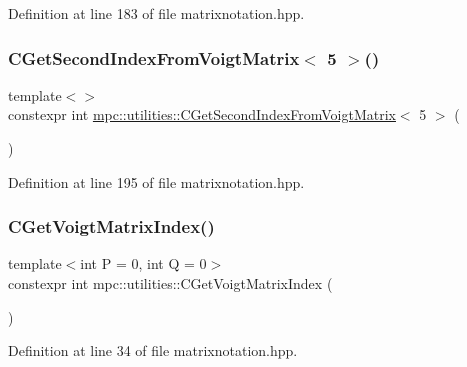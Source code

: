 Definition at line 183 of file matrixnotation.\+hpp.

\mbox{\label{namespacempc_1_1utilities_a070e4f2163645cfbe7e03651d594016e}} 
\subsubsection{\texorpdfstring{C\+Get\+Second\+Index\+From\+Voigt\+Matrix$<$ 5 $>$()}{CGetSecondIndexFromVoigtMatrix< 5 >()}}
{\footnotesize\ttfamily template$<$$>$ \\
constexpr int \mbox{\hyperlink{namespacempc_1_1utilities_a094a324d81b996e8397336286264dfcd}{mpc\+::utilities\+::\+C\+Get\+Second\+Index\+From\+Voigt\+Matrix}}$<$ 5 $>$ (\begin{DoxyParamCaption}{ }\end{DoxyParamCaption})\hspace{0.3cm}{\ttfamily [inline]}}



Definition at line 195 of file matrixnotation.\+hpp.

\mbox{\label{namespacempc_1_1utilities_ad2c3679a8e007d8b5a333490886ef19d}} 
\subsubsection{\texorpdfstring{C\+Get\+Voigt\+Matrix\+Index()}{CGetVoigtMatrixIndex()}}
{\footnotesize\ttfamily template$<$int P = 0, int Q = 0$>$ \\
constexpr int mpc\+::utilities\+::\+C\+Get\+Voigt\+Matrix\+Index (\begin{DoxyParamCaption}{ }\end{DoxyParamCaption})\hspace{0.3cm}{\ttfamily [inline]}}



Definition at line 34 of file matrixnotation.\+hpp.


